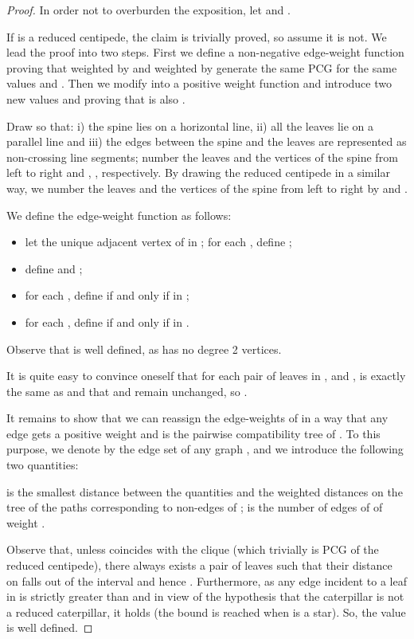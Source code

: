 \documentclass[review]{elsarticle}
\begin{document}
\begin{proof}
In order not to overburden the exposition, let  and .

If  is a reduced centipede, the claim is trivially proved, so assume it is not.
We lead the proof into two steps. 
First we define a non-negative edge-weight function  proving that  weighted by  and  weighted by  generate the same PCG  for the same values  and  .
Then we modify  into a positive weight function  and introduce two new values  and  proving that  is also .

Draw  so that: i) the spine lies on a horizontal line, ii) all the leaves lie on a parallel line and iii) the edges between the spine and the leaves are represented as non-crossing line segments; number the leaves and the vertices of the spine from left to right  and , , respectively.
By drawing the reduced centipede  in a similar way, we number the leaves and the vertices of the spine from left to right by  and .

We define the edge-weight function  as follows:

\begin{itemize}
\item
let  the unique adjacent vertex of  in ; for each , define ;
\item
define  and ;
\item
for each , define  if and only if  in ;
\item
for each , define  if and only if  in .
\end{itemize}

Observe that  is well defined, as  has no degree 2 vertices.
 
It is quite easy to convince oneself that for each pair of leaves in ,  and ,  is exactly the same as  and that  and   remain unchanged, so . 

\medskip

It remains to show that we can reassign the edge-weights of  in a way that any edge gets a positive weight and   is the pairwise compatibility tree of . To this purpose, we denote by  the edge set of any graph , and we introduce the following two quantities:


 is the smallest distance between the quantities  and the weighted distances on the tree of the
paths  corresponding to non-edges of ; 
 is the number of edges of  of weight . 

Observe that, unless  coincides with the clique  (which trivially is PCG of the reduced centipede), there always exists a pair of leaves such that their distance on  falls out of the interval  and hence . 
Furthermore, as any edge incident to a leaf in  is strictly greater than  and in view of the hypothesis that the caterpillar  is not a reduced caterpillar, it holds 
 (the bound  is reached when  is a star).
So, the value  is well defined.


\end{proof}
\end{document}
